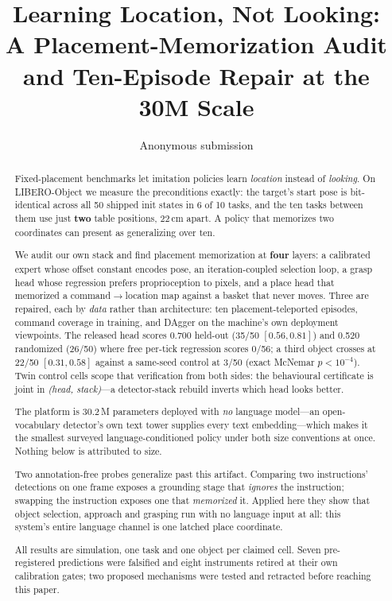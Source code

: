 \documentclass[10pt,letterpaper]{article}
\title{\bfseries Learning Location, Not Looking:\\
A Placement-Memorization Audit and Ten-Episode Repair at the 30M Scale}
\author{Anonymous submission}
\date{}
\begin{document}
\maketitle

\begin{abstract}
Fixed-placement benchmarks let imitation policies learn \emph{location} instead
of \emph{looking}. On LIBERO-Object we measure the preconditions exactly: the
target's start pose is bit-identical across all 50 shipped init states in 6 of
10 tasks, and the ten tasks between them use just \textbf{two} table positions,
22\,cm apart. A policy that memorizes two coordinates can present as
generalizing over ten.

We audit our own stack and find placement memorization at \textbf{four} layers:
a calibrated expert whose offset constant encodes pose, an iteration-coupled
selection loop, a grasp head whose regression prefers proprioception to pixels,
and a place head that memorized a command$\to$location map against a basket that
never moves. Three are repaired, each by \emph{data} rather than architecture:
ten placement-teleported episodes, command coverage in training, and DAgger on
the machine's own deployment viewpoints. The released head scores 0.700
held-out (35/50 $[0.56,0.81]$) and 0.520 randomized (26/50) where free per-tick
regression scores 0/56; a third object crosses at 22/50 $[0.31,0.58]$ against a
same-seed control at 3/50 (exact McNemar $p<10^{-4}$). Twin control
cells scope that verification from both sides: the behavioural certificate is
joint in \emph{(head, stack)}---a detector-stack rebuild inverts which head
looks better.

The platform is 30.2\,M parameters deployed with \emph{no} language model---an
open-vocabulary detector's own text tower supplies every text embedding---which
makes it the smallest surveyed language-conditioned policy under both size
conventions at once. Nothing below is attributed to size.

Two annotation-free probes generalize past this artifact. Comparing two
instructions' detections on one frame exposes a grounding stage that
\emph{ignores} the instruction; swapping the instruction exposes one that
\emph{memorized} it. Applied here they show that object selection, approach and
grasping run with no language input at all: this system's entire language
channel is one latched place coordinate.

All results are simulation, one task and one object per claimed cell. Seven
pre-registered predictions were falsified and eight instruments retired at
their own calibration gates; two proposed mechanisms were tested and retracted
before reaching this paper.
\end{abstract}
\end{document}

